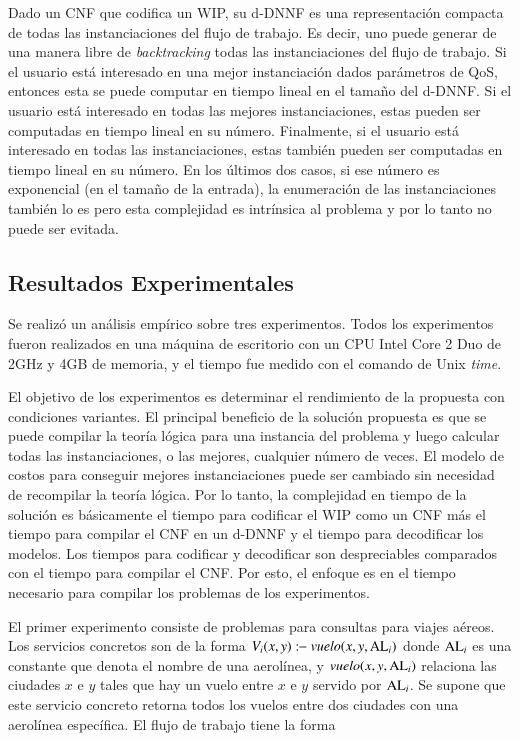 Dado un CNF que codifica un WIP, su d-DNNF es una representación compacta de
todas las instanciaciones del flujo de trabajo. Es decir, uno puede generar de
una manera libre de \emph{backtracking} todas las instanciaciones del flujo de
trabajo. Si el usuario está interesado en una mejor instanciación dados
parámetros de QoS, entonces esta se puede computar en tiempo lineal en el tamaño
del d-DNNF. Si el usuario está interesado en todas las mejores instanciaciones,
estas pueden ser computadas en tiempo lineal en su número. Finalmente, si el
usuario está interesado en todas las instanciaciones, estas también pueden ser
computadas en tiempo lineal en su número. En los últimos dos casos, si ese
número es exponencial (en el tamaño de la entrada), la enumeración de las
instanciaciones también lo es pero esta complejidad es intrínsica al problema y
por lo tanto no puede ser evitada.

\subsection{Resultados Experimentales}

Se realizó un análisis empírico sobre tres experimentos. Todos los experimentos
fueron realizados en una máquina de escritorio con un CPU Intel Core 2 Duo de
2GHz y 4GB de memoria, y el tiempo fue medido con el comando de Unix
\emph{time}.

El objetivo de los experimentos es determinar el rendimiento de la propuesta con
condiciones variantes. El principal beneficio de la solución propuesta es
que se puede compilar la teoría lógica para una instancia del problema y luego
calcular todas las instanciaciones, o las mejores, cualquier número de veces. El
modelo de costos para conseguir mejores instanciaciones puede ser cambiado sin
necesidad de recompilar la teoría lógica. Por lo tanto, la complejidad en tiempo
de la solución es básicamente el tiempo para codificar el WIP como un
CNF más el tiempo para compilar el CNF en un d-DNNF y el tiempo para decodificar
los modelos. Los tiempos para codificar y decodificar son despreciables
comparados con el tiempo para compilar el CNF. Por esto, el enfoque es en el tiempo
necesario para compilar los problemas de los experimentos.

El primer experimento consiste de problemas para consultas para viajes aéreos.
Los servicios concretos son de la forma $V_i(x,y):\!\!-\ \text{\it vuelo}(x,y,\text{AL}_i)$
donde $\text{AL}_i$ es una
constante que denota el nombre de una aerolínea, y $\text{\it vuelo}(x,y,\text{AL}_i)$ relaciona las
ciudades $x$ e $y$ tales que hay un vuelo entre $x$ e $y$ servido por $\text{AL}_i$.
Se supone que este servicio concreto retorna todos los vuelos entre dos ciudades
con una aerolínea específica. El flujo de trabajo tiene la forma

